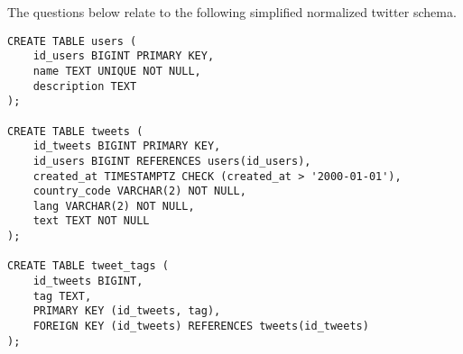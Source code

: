 \documentclass[12pt]{exam}
\theoremstyle{definition}
\begin{document}


\newpage
\noindent
The questions below relate to the following simplified normalized twitter schema.

\begin{lstlisting}
CREATE TABLE users (
    id_users BIGINT PRIMARY KEY,
    name TEXT UNIQUE NOT NULL,
    description TEXT
);

CREATE TABLE tweets (
    id_tweets BIGINT PRIMARY KEY,
    id_users BIGINT REFERENCES users(id_users),
    created_at TIMESTAMPTZ CHECK (created_at > '2000-01-01'),
    country_code VARCHAR(2) NOT NULL,
    lang VARCHAR(2) NOT NULL,
    text TEXT NOT NULL
);

CREATE TABLE tweet_tags (
    id_tweets BIGINT,
    tag TEXT,
    PRIMARY KEY (id_tweets, tag),
    FOREIGN KEY (id_tweets) REFERENCES tweets(id_tweets)
);
\end{lstlisting}
\end{document}
